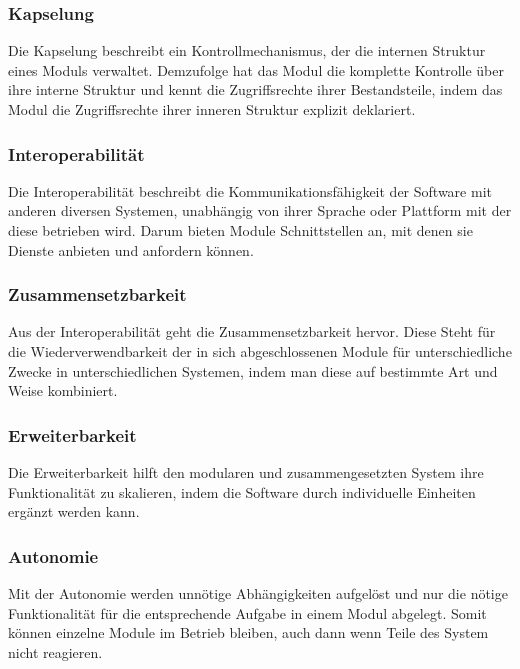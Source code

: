     \subsubsection{Kapselung}
      Die Kapselung beschreibt ein Kontrollmechanismus, der die internen Struktur eines Moduls verwaltet.
      Demzufolge hat das Modul die komplette Kontrolle über ihre interne Struktur und kennt die Zugriffsrechte ihrer Bestandsteile, indem das Modul die Zugriffsrechte ihrer inneren Struktur explizit deklariert.

    \subsubsection{Interoperabilität}
      Die Interoperabilität beschreibt die Kommunikationsfähigkeit der Software mit anderen diversen Systemen, unabhängig von ihrer Sprache oder Plattform mit der diese betrieben wird. 
      Darum bieten Module Schnittstellen an, mit denen sie Dienste anbieten und anfordern können.

    \subsubsection{Zusammensetzbarkeit}
      Aus der Interoperabilität geht die Zusammensetzbarkeit hervor.
      Diese Steht für die Wiederverwendbarkeit der in sich abgeschlossenen Module für unterschiedliche Zwecke in unterschiedlichen Systemen, indem man diese auf bestimmte Art und Weise kombiniert. 

    \subsubsection{Erweiterbarkeit}
     Die Erweiterbarkeit hilft den modularen und zusammengesetzten System ihre Funktionalität zu skalieren, indem die Software durch individuelle Einheiten ergänzt werden kann. 

    \subsubsection{Autonomie}
      Mit der Autonomie werden unnötige Abhängigkeiten aufgelöst und nur die nötige Funktionalität für die entsprechende Aufgabe in einem Modul abgelegt. 
      Somit können einzelne Module im Betrieb bleiben, auch dann wenn Teile des System nicht reagieren.

